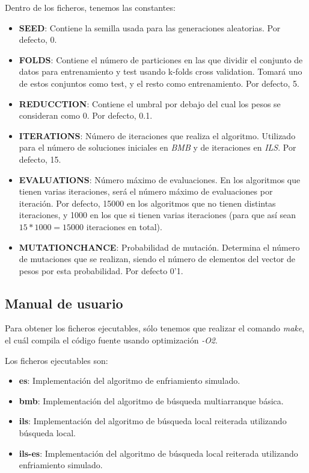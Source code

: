 \documentclass[11pt,a4paper]{article}
\begin{document}
Dentro de los ficheros, tenemos las constantes:
\begin{itemize}
\item \textbf{SEED}: Contiene la semilla usada para las generaciones aleatorias. Por defecto, 0.
\item \textbf{FOLDS}: Contiene el número de particiones en las que dividir el conjunto de datos para entrenamiento y test usando k-folds cross validation. Tomará uno de estos conjuntos como test, y el resto como entrenamiento. Por defecto, 5.
\item \textbf{REDUCCTION}: Contiene el umbral por debajo del cual los pesos se consideran como 0. Por defecto, 0.1.
\item \textbf{ITERATIONS}: Número de iteraciones que realiza el algoritmo. Utilizado para el número de soluciones iniciales en \emph{BMB} y de iteraciones en \emph{ILS}. Por defecto, 15.
\item \textbf{EVALUATIONS}: Número máximo de evaluaciones. En los algoritmos que tienen varias iteraciones, será el número máximo de evaluaciones por iteración. Por defecto, 15000 en los algoritmos que no tienen distintas iteraciones, y 1000 en los que si tienen varias iteraciones (para que así sean $15 * 1000 = 15000$ iteraciones en total).
\item \textbf{MUTATIONCHANCE}: Probabilidad de mutación. Determina el número de mutaciones que se realizan, siendo el número de elementos del vector de pesos por esta probabilidad. Por defecto 0'1.
\end{itemize}

\subsection{Manual de usuario}

Para obtener los ficheros ejecutables, sólo tenemos que realizar el comando \emph{make}, el cuál compila el código fuente usando optimización \emph{-O2}.

Los ficheros ejecutables son:
\begin{itemize}
\item \textbf{es}: Implementación del algoritmo de enfriamiento simulado.
\item \textbf{bmb}: Implementación del algoritmo de búsqueda multiarranque básica.
\item \textbf{ils}: Implementación del algoritmo de búsqueda local reiterada utilizando búsqueda local.
\item \textbf{ils-es}: Implementación del algoritmo de búsqueda local reiterada utilizando enfriamiento simulado.
\end{itemize}
\end{document}
